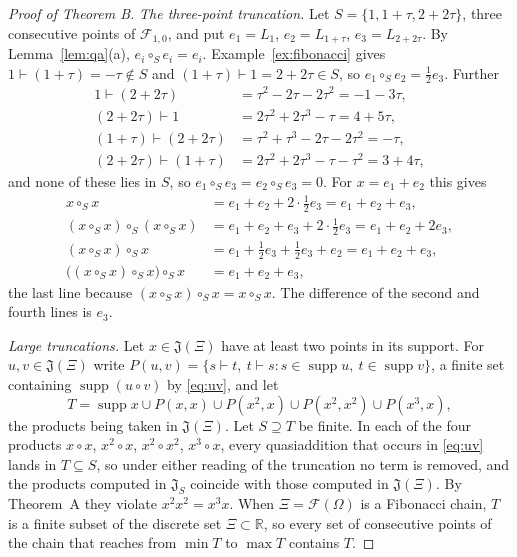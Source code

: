 \documentclass[11pt]{amsart}
\theoremstyle{definition}
\theoremstyle{remark}
\newcommand{\R}{\mathbb{R}}
\newcommand{\J}{\mathfrak{J}}
\newcommand{\qa}{\vdash}
\newcommand{\supp}{\operatorname{supp}}
\begin{document}
\begin{proof}[Proof of Theorem B]
\emph{The three-point truncation.} Let $S=\{1,1+\tau,2+2\tau\}$, three consecutive points of $\mathcal F_{1,0}$, and put $e_1=L_1$, $e_2=L_{1+\tau}$, $e_3=L_{2+2\tau}$. By Lemma~\ref{lem:qa}(a), $e_i\circ_Se_i=e_i$. Example~\ref{ex:fibonacci} gives $1\qa(1+\tau)=-\tau\notin S$ and $(1+\tau)\qa1=2+2\tau\in S$, so $e_1\circ_Se_2=\frac12e_3$. Further
\begin{align*}
1\qa(2+2\tau)&=\tau^2-2\tau-2\tau^2=-1-3\tau,\\
(2+2\tau)\qa1&=2\tau^2+2\tau^3-\tau=4+5\tau,\\
(1+\tau)\qa(2+2\tau)&=\tau^2+\tau^3-2\tau-2\tau^2=-\tau,\\
(2+2\tau)\qa(1+\tau)&=2\tau^2+2\tau^3-\tau-\tau^2=3+4\tau,
\end{align*}
and none of these lies in $S$, so $e_1\circ_Se_3=e_2\circ_Se_3=0$. For $x=e_1+e_2$ this gives
\begin{align*}
x\circ_Sx&=e_1+e_2+2\cdot\tfrac12e_3=e_1+e_2+e_3,\\
(x\circ_Sx)\circ_S(x\circ_Sx)&=e_1+e_2+e_3+2\cdot\tfrac12e_3=e_1+e_2+2e_3,\\
(x\circ_Sx)\circ_Sx&=e_1+\tfrac12e_3+\tfrac12e_3+e_2=e_1+e_2+e_3,\\
\bigl((x\circ_Sx)\circ_Sx\bigr)\circ_Sx&=e_1+e_2+e_3,
\end{align*}
the last line because $(x\circ_Sx)\circ_Sx=x\circ_Sx$. The difference of the second and fourth lines is $e_3$.

\emph{Large truncations.} Let $x\in\J(\Xi)$ have at least two points in its support. For $u,v\in\J(\Xi)$ write $P(u,v)=\{s\qa t,\ t\qa s:s\in\supp u,\ t\in\supp v\}$, a finite set containing $\supp(u\circ v)$ by \eqref{eq:uv}, and let
\[
T=\supp x\cup P(x,x)\cup P(x^2,x)\cup P(x^2,x^2)\cup P(x^3,x),
\]
the products being taken in $\J(\Xi)$. Let $S\supseteq T$ be finite. In each of the four products $x\circ x$, $x^2\circ x$, $x^2\circ x^2$, $x^3\circ x$, every quasiaddition that occurs in \eqref{eq:uv} lands in $T\subseteq S$, so under either reading of the truncation no term is removed, and the products computed in $\J_S$ coincide with those computed in $\J(\Xi)$. By Theorem~A they violate $x^2x^2=x^3x$. When $\Xi=\mathcal F(\Omega)$ is a Fibonacci chain, $T$ is a finite subset of the discrete set $\Xi\subset\R$, so every set of consecutive points of the chain that reaches from $\min T$ to $\max T$ contains $T$.
\end{proof}
\end{document}
